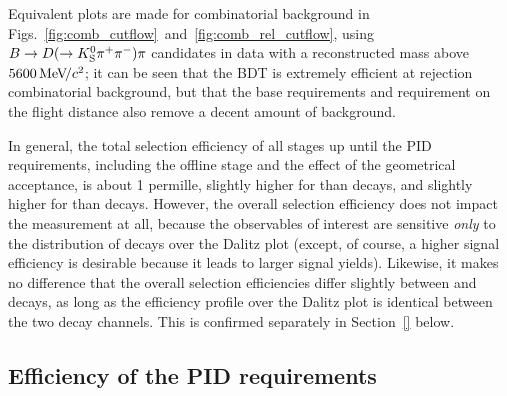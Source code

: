 Equivalent plots are made for combinatorial background in Figs.~\ref{fig:comb_cutflow}~and~\ref{fig:comb_rel_cutflow}, using ${B}\rightarrow{\ensuremath{D}}(\rightarrow{\ensuremath{{K}^0_{\mathrm{S}}}}{\ensuremath{{\pi}^+}}{\ensuremath{{\pi}^-}})\pi$ candidates in data with a reconstructed \B mass above $5600\text{\,Me\kern -0.1em V\!/}c^2$; it can be seen that the BDT is extremely efficient at rejection combinatorial background, but that the base requirements and requirement on the \KS flight distance also remove a decent amount of background.

In general, the total selection efficiency of all stages up until the PID requirements, including the offline stage and the effect of the geometrical \lhcb acceptance, is about 1 permille, slightly higher for \BtoDK than \BtoDpi decays, and slightly higher for \DtoKsKK than \DtoKspipi decays. However, the overall selection efficiency does not impact the measurement at all, because the observables of interest are sensitive  \emph{only} to the distribution of decays over the Dalitz plot (except, of course, a higher signal efficiency is desirable because it leads to larger signal yields). Likewise, it makes no difference that the overall selection efficiencies differ slightly between \BtoDK and \BtoDpi decays, as long as the efficiency profile over the Dalitz plot is identical between the two decay channels. This is confirmed separately in Section~\ref{} below.

\subsection{Efficiency of the PID requirements} %
\label{sub:efficiency_of_the_pid_requirements}

